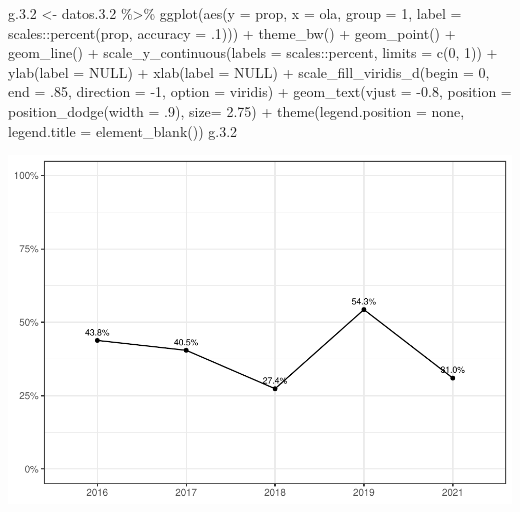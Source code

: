 \documentclass[
  12pt,
]{book}
\newenvironment{Shaded}{\begin{snugshade}}{\end{snugshade}}
\newcommand{\AttributeTok}[1]{\textcolor[rgb]{0.77,0.63,0.00}{#1}}
\newcommand{\ConstantTok}[1]{\textcolor[rgb]{0.00,0.00,0.00}{#1}}
\newcommand{\DecValTok}[1]{\textcolor[rgb]{0.00,0.00,0.81}{#1}}
\newcommand{\FloatTok}[1]{\textcolor[rgb]{0.00,0.00,0.81}{#1}}
\newcommand{\FunctionTok}[1]{\textcolor[rgb]{0.00,0.00,0.00}{#1}}
\newcommand{\NormalTok}[1]{#1}
\newcommand{\OtherTok}[1]{\textcolor[rgb]{0.56,0.35,0.01}{#1}}
\newcommand{\SpecialCharTok}[1]{\textcolor[rgb]{0.00,0.00,0.00}{#1}}
\newcommand{\StringTok}[1]{\textcolor[rgb]{0.31,0.60,0.02}{#1}}
\begin{document}
\begin{Shaded}
\begin{Highlighting}[]
\NormalTok{g.}\FloatTok{3.2} \OtherTok{\textless{}{-}}\NormalTok{ datos.}\FloatTok{3.2} \SpecialCharTok{\%\textgreater{}\%} 
  \FunctionTok{ggplot}\NormalTok{(}\FunctionTok{aes}\NormalTok{(}\AttributeTok{y =}\NormalTok{ prop, }\AttributeTok{x =}\NormalTok{ ola, }\AttributeTok{group =} \DecValTok{1}\NormalTok{,}
               \AttributeTok{label =}\NormalTok{ scales}\SpecialCharTok{::}\FunctionTok{percent}\NormalTok{(prop, }\AttributeTok{accuracy =}\NormalTok{ .}\DecValTok{1}\NormalTok{))) }\SpecialCharTok{+}
  \FunctionTok{theme\_bw}\NormalTok{() }\SpecialCharTok{+} 
  \FunctionTok{geom\_point}\NormalTok{() }\SpecialCharTok{+}
  \FunctionTok{geom\_line}\NormalTok{() }\SpecialCharTok{+} 
  \FunctionTok{scale\_y\_continuous}\NormalTok{(}\AttributeTok{labels =}\NormalTok{ scales}\SpecialCharTok{::}\NormalTok{percent,}
                     \AttributeTok{limits =} \FunctionTok{c}\NormalTok{(}\DecValTok{0}\NormalTok{, }\DecValTok{1}\NormalTok{)) }\SpecialCharTok{+}
  \FunctionTok{ylab}\NormalTok{(}\AttributeTok{label =} \ConstantTok{NULL}\NormalTok{) }\SpecialCharTok{+}
  \FunctionTok{xlab}\NormalTok{(}\AttributeTok{label =} \ConstantTok{NULL}\NormalTok{) }\SpecialCharTok{+}
  \FunctionTok{scale\_fill\_viridis\_d}\NormalTok{(}\AttributeTok{begin =} \DecValTok{0}\NormalTok{, }\AttributeTok{end =}\NormalTok{ .}\DecValTok{85}\NormalTok{, }\AttributeTok{direction =} \SpecialCharTok{{-}}\DecValTok{1}\NormalTok{, }\AttributeTok{option =} \StringTok{\textquotesingle{}viridis\textquotesingle{}}\NormalTok{) }\SpecialCharTok{+}
  \FunctionTok{geom\_text}\NormalTok{(}\AttributeTok{vjust =} \SpecialCharTok{{-}}\FloatTok{0.8}\NormalTok{,}
            \AttributeTok{position =} \FunctionTok{position\_dodge}\NormalTok{(}\AttributeTok{width =}\NormalTok{ .}\DecValTok{9}\NormalTok{),}
            \AttributeTok{size=} \FloatTok{2.75}\NormalTok{) }\SpecialCharTok{+}
  \FunctionTok{theme}\NormalTok{(}\AttributeTok{legend.position =} \StringTok{\textquotesingle{}none\textquotesingle{}}\NormalTok{,   }
        \AttributeTok{legend.title =} \FunctionTok{element\_blank}\NormalTok{())}
\NormalTok{g.}\FloatTok{3.2}
\end{Highlighting}
\end{Shaded}

\includegraphics{reporte-elsoc_files/figure-latex/unnamed-chunk-24-1.pdf}
\end{document}
